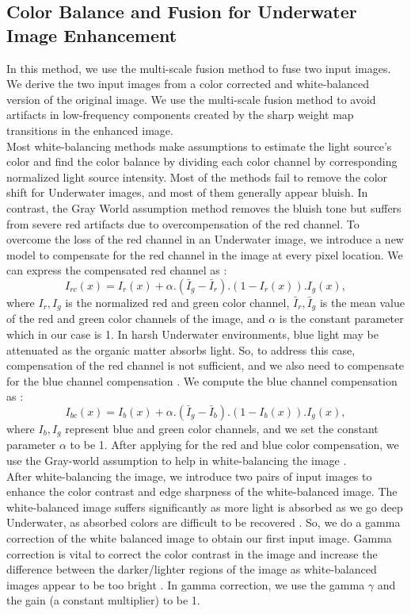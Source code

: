 \documentclass[a4paper,11pt,oneside]{article}
\begin{document}
\subsection{Color Balance and Fusion for Underwater Image Enhancement \cite{16}}
In this method, we use the multi-scale fusion method to fuse two input images. We derive the two input images from a color corrected and white-balanced version of the original image. We use the multi-scale fusion method to avoid artifacts in low-frequency components created by the sharp weight map transitions in the enhanced image.\cite{16}\\
Most white-balancing methods make assumptions to estimate the light source's color and find the color balance by dividing each color channel by corresponding normalized light source intensity.  Most of the methods fail to remove the color shift for Underwater images, and most of them generally appear bluish. In contrast, the Gray World assumption method removes the bluish tone but suffers from severe red artifacts due to overcompensation of the red channel. To overcome the loss of the red channel in an Underwater image, we introduce a new model to compensate for the red channel in the image at every pixel location. \cite{16} We can express the compensated red channel as \cite{16}:
$${I}_{rc}(x)={I}_{r}(x)+ \alpha . (\bar {I}_{g}-\bar {I}_{r}). (1 - {I}_{r}(x)) . {I}_{g}(x),$$
where $I_{r}, I_{g}$ is the normalized red and green color channel, $\bar {I}_{r},\bar {I}_{g}$ is the mean value of the red and green color channels of the image, and $\alpha$ is the constant parameter which in our case is 1. In harsh Underwater environments, blue light may be attenuated as the organic matter absorbs light. So, to address this case, compensation of the red channel is not sufficient, and we also need to compensate for the blue channel compensation \cite{16}. We compute the blue channel compensation as \cite{16}:
 $${I}_{bc}(x)={I}_{b}(x)+ \alpha . (\bar {I}_{g}-\bar {I}_{b}). (1 - {I}_{b}(x)) . {I}_{g}(x),$$
 where $I_{b}, I_{g}$ represent blue and green color channels, and we set the constant parameter $\alpha$ to be 1. After applying for the red and blue color compensation, we use the Gray-world assumption to help in white-balancing the image \cite{16}.\\
  After white-balancing the image, we introduce two pairs of input images to enhance the color contrast and edge sharpness of the white-balanced image. The white-balanced image suffers significantly as more light is absorbed as we go deep Underwater, as absorbed colors are difficult to be recovered \cite{16}. So, we do a gamma correction of the white balanced image to obtain our first input image. Gamma correction is vital to correct the color contrast in the image and increase the difference between the darker/lighter regions of the image as white-balanced images appear to be too bright \cite{16}. In gamma correction, we use the gamma $\gamma$ and the gain (a constant multiplier) to be 1.\\
\end{document}
